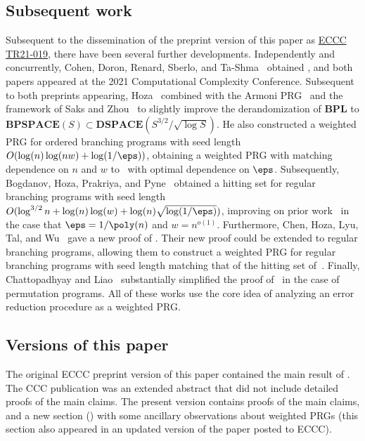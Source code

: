 \documentclass{toc}
\begin{document}
\subsection{Subsequent work}
Subsequent to the dissemination of the preprint version of this %
paper %
%
%
%
%
%
%
as \href{https://eccc.weizmann.ac.il/report/2021/019/}{ECCC TR21-019},
there have been several further developments. Independently and concurrently, Cohen, Doron, Renard, Sberlo, and Ta-Shma~\cite{CohenDoReSbTa21} obtained , and both papers appeared at the 2021 Computational Complexity Conference. 
%
Subsequent to both preprints appearing, Hoza~\cite{Hoza21} combined  with the Armoni PRG~\cite{Armoni98} and the framework of Saks and Zhou~\cite{SaksZh99} to slightly improve the derandomization of $\mathbf{BPL}$ to %
$\mathbf{BPSPACE}(S)\subset \mathbf{DSPACE}(S^{3/2}/\sqrt{\log S})$. %
He also constructed a weighted PRG for ordered branching programs with seed length $O(\log(n)\log(nw)+\log(1/\eps))$, obtaining a weighted PRG with matching dependence on $n$ and $w$ to~\cite{Nisan92} with optimal dependence on $\eps$. 
%
%
Subsequently, 
%
Bogdanov, Hoza, Prakriya, and Pyne~\cite{BHPP22} obtained a hitting set for regular branching programs with seed length $O(\log^{3/2}n+\log(n)\log(w)+\log(n)\sqrt{\log(1/\eps)})$, improving on prior work~\cite{BravermanRaRaYe10} in the case that $\eps=1/\poly(n)$ and $w=n^{o(1)}$. %
%
Furthermore, Chen, Hoza, Lyu, Tal, and Wu~\cite{CHLTW23} gave a new proof of . Their new proof could be extended to regular branching programs, allowing them to construct a weighted PRG for regular branching programs with seed length matching that of the hitting set of~\cite{BHPP22}. Finally, Chattopadhyay and Liao~\cite{CL24} substantially simplified the proof of~\cite{CHLTW23} in the case of permutation programs. All of these works use the core idea of analyzing an error reduction procedure as a weighted PRG.

\subsection{Versions of this paper}
The original ECCC preprint version of this paper contained the main result of . The CCC publication was an extended abstract that did not include detailed proofs of the main claims. The present version contains proofs of the main claims, and a new section () with some ancillary observations about weighted PRGs (this section also appeared in an updated version of the paper posted to ECCC).
%
\end{document}
